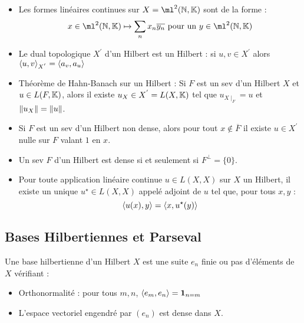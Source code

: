 \documentclass{cours}
\begin{document}
\begin{remark}
    \begin{itemize}
        \item Les formes linéaires continues sur $X = \ml^{2}(\N, \K)$ sont de la forme : 
        \[
            x \in \ml^{2}(\N, \K) \mapsto \sum_{n} x_{n}\overline{y_{n}} \text{ pour un } y \in \ml^{2}(\N, \K)
        \]
        \item Le dual topologique $X^{'}$ d'un Hilbert est un Hilbert : si $u, v \in X^{'}$ alors $\left\langle u, v \right\rangle_{X^{'}} = \left\langle a_{v}, a_{u} \right\rangle$
        \item Théorème de Hahn-Banach sur un Hilbert : Si $F$ est un sev d'un Hilbert $X$ et $u \in L(F, \mathbb{K})$, alors il existe $u_{X} \in X^{'} = L(X, \mathbb{K})$ tel que $u_{X \mid_{F}} = u$ et $\left\lVert u_{X} \right\rVert = \left\lVert u \right\rVert$.
        \item Si $F$ est un sev d'un Hilbert non dense, alors pour tout $x \notin \overline{F}$ il existe $u \in X^{'}$ nulle sur $F$ valant $1$ en $x$.
        \item Un sev $F$ d'un Hilbert est dense si et seulement si $F^{\perp}= \{0\}$.
        \item Pour toute application linéaire continue $u \in L(X, X)$ sur $X$ un Hilbert, il existe un unique $u^{\star} \in L(X, X)$ appelé adjoint de $u$ tel que, pour tous $x, y$ : 
        \[
            \left\langle u(x), y \right\rangle = \left\langle x, u^{\star}(y) \right\rangle
        \]
    \end{itemize}
\end{remark}

\subsection{Bases Hilbertiennes et Parseval}
\begin{definition}
    Une base hilbertienne d'un Hilbert $X$ est une suite $e_{n}$ finie ou pas d'éléments de $X$ vérifiant : 
    \begin{itemize}
        \item Orthonormalité : pour tous $m, n$, $\left\langle e_{m}, e_{n} \right\rangle = \mathbf{1}_{n = m}$
        \item L'espace vectoriel engendré par $(e_{n})$ est dense dans $X$. 
    \end{itemize}
\end{definition}
\end{document}
